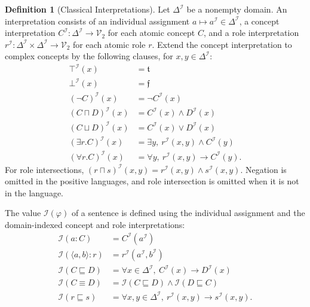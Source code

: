 \documentclass[letterpaper]{article} %
\theoremstyle{definition}
\theoremstyle{definition}
\newtheorem{definition}{Definition}
\theoremstyle{definition}
\theoremstyle{definition}
\theoremstyle{definition}
\newcommand{\isa}{\mathbin{{:}}}
\newcommand{\vt}{\mathfrak{t}}
\newcommand{\vf}{\mathfrak{f}}
\begin{document}
\begin{definition}[Classical Interpretations]\label{def:ALC-Interp-Non-Standard}
Let $\Delta^{\mathcal{I}}$ be a nonempty domain. An interpretation consists of an individual assignment $a\mapsto a^{\mathcal{I}}\in\Delta^{\mathcal{I}}$, a concept interpretation $C^{\mathcal{I}}:\Delta^{\mathcal{I}}\to\mathcal{V}_{2}$ for each atomic concept $C$, and a role interpretation $r^{\mathcal{I}}:\Delta^{\mathcal{I}}\times\Delta^{\mathcal{I}}\to\mathcal{V}_{2}$ for each atomic role $r$. Extend the concept interpretation to complex concepts by the following clauses, for $x,y\in\Delta^{\mathcal{I}}$:
\begin{align*}
\top^{\mathcal{I}}(x)&=\vt\\
\bot^{\mathcal{I}}(x)&=\vf\\
(\neg C)^{\mathcal{I}}(x)&=\lnot C^{\mathcal{I}}(x)\\
(C\sqcap D)^{\mathcal{I}}(x)&=C^{\mathcal{I}}(x)\land D^{\mathcal{I}}(x)\\
(C\sqcup D)^{\mathcal{I}}(x)&=C^{\mathcal{I}}(x)\lor D^{\mathcal{I}}(x)\\
(\exists r.C)^{\mathcal{I}}(x)&=\exists y,\ r^{\mathcal{I}}(x,y)\land C^{\mathcal{I}}(y)\\
(\forall r.C)^{\mathcal{I}}(x)&=\forall y,\ r^{\mathcal{I}}(x,y)\rightarrow C^{\mathcal{I}}(y).
\end{align*}
For role intersections, $(r\sqcap s)^{\mathcal{I}}(x,y)=r^{\mathcal{I}}(x,y)\land s^{\mathcal{I}}(x,y)$. Negation is omitted in the positive languages, and role intersection is omitted when it is not in the language.

The value $\mathcal{I}(\varphi)$ of a sentence is defined using the individual assignment and the domain-indexed concept and role interpretations:
\begin{align*}
\mathcal{I}(a\isa C)&=C^{\mathcal{I}}(a^{\mathcal{I}})\\
\mathcal{I}(\langle a,b\rangle\isa r)&=r^{\mathcal{I}}(a^{\mathcal{I}},b^{\mathcal{I}})\\
\mathcal{I}(C\sqsubseteq D)&=\forall x\in\Delta^{\mathcal{I}},\ C^{\mathcal{I}}(x)\rightarrow D^{\mathcal{I}}(x)\\
\mathcal{I}(C\equiv D)&=\mathcal{I}(C\sqsubseteq D)\land\mathcal{I}(D\sqsubseteq C)\\
\mathcal{I}(r\sqsubseteq s)&=\forall x,y\in\Delta^{\mathcal{I}},\ r^{\mathcal{I}}(x,y)\rightarrow s^{\mathcal{I}}(x,y).
\end{align*}
\end{definition}
\end{document}
